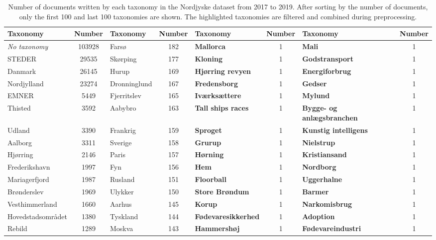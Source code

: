 \begin{table*}[h]
	\caption{Number of documents written by each taxonomy in the Nordjyske dataset from 2017 to 2019.
	After sorting by the number of documents, only the first 100 and last 100 taxonomies are shown.
	The highlighted taxonomies are filtered and combined during preprocessing.}
	\label{tab:taxonomy_table}
	\centering
	\scriptsize
	\begin{tabular}{l|c|l|c|l|c|l|c}
		Taxonomy                & Number & Taxonomy                     & Number & Taxonomy                       & Number & Taxonomy                       & Number \\
		\midrule
		\emph{No taxonomy} & 103928 & Farsø & 182 & \textbf{Mallorca} & 1 & \textbf{Mali} & 1 \\
		STEDER & 29535 & Skørping & 177 & \textbf{Kloning} & 1 & \textbf{Godstransport} & 1 \\
		Danmark & 26145 & Hurup & 169 & \textbf{Hjørring revyen} & 1 & \textbf{Energiforbrug} & 1 \\
		Nordjylland & 23274 & Dronninglund & 167 & \textbf{Fredensborg} & 1 & \textbf{Gedser} & 1 \\
		EMNER & 5449 & Fjerritslev & 165 & \textbf{Iværksættere} & 1 & \textbf{Mylund} & 1 \\
		Thisted & 3592 & Aabybro & 163 & \textbf{Tall ships races} & 1 & \textbf{Bygge- og anlægsbranchen} & 1 \\
		Udland & 3390 & Frankrig & 159 & \textbf{Sproget} & 1 & \textbf{Kunstig intelligens} & 1 \\
		Aalborg & 3311 & Sverige & 158 & \textbf{Grurup} & 1 & \textbf{Nielstrup} & 1 \\
		Hjørring & 2146 & Paris & 157 & \textbf{Hørning} & 1 & \textbf{Kristiansand} & 1 \\
		Frederikshavn & 1997 & Fyn & 156 & \textbf{Hem} & 1 & \textbf{Nordborg} & 1 \\
		Mariagerfjord & 1987 & Rusland & 151 & \textbf{Floorball} & 1 & \textbf{Uggerhalne} & 1 \\
		Brønderslev & 1969 & Ulykker & 150 & \textbf{Store Brøndum} & 1 & \textbf{Barmer} & 1 \\
		Vesthimmerland & 1660 & Aarhus & 145 & \textbf{Korup} & 1 & \textbf{Narkomisbrug} & 1 \\
		Hovedstadsområdet & 1380 & Tyskland & 144 & \textbf{Fødevaresikkerhed} & 1 & \textbf{Adoption} & 1 \\
		Rebild & 1289 & Moskva & 143 & \textbf{Hammershøj} & 1 & \textbf{Fødevareindustri} & 1 \\

\end{tabular}
\end{table*}
